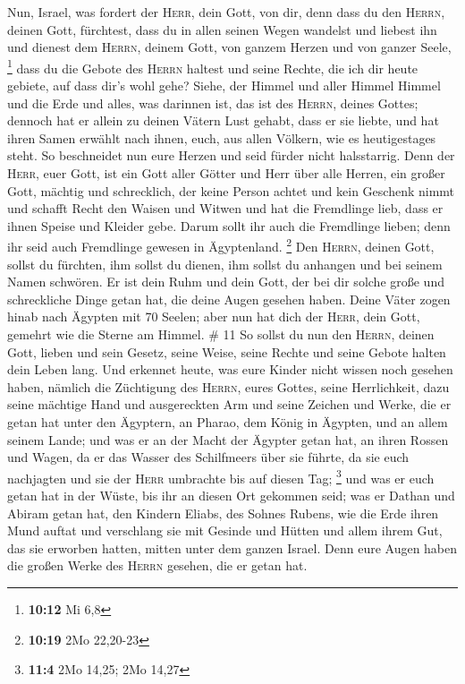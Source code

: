  Nun, Israel, was fordert der \textsc{Herr}, dein Gott,
von dir, denn dass du den \textsc{Herrn}, deinen Gott, fürchtest, dass
du in allen seinen Wegen wandelst und liebest ihn und dienest dem
\textsc{Herrn}, deinem Gott, von ganzem Herzen und von ganzer Seele,
\footnote{\textbf{10:12} Mi 6,8}  dass du die Gebote des
\textsc{Herrn} haltest und seine Rechte, die ich dir heute gebiete, auf
dass dir's wohl gehe?  Siehe, der Himmel und aller Himmel
Himmel und die Erde und alles, was darinnen ist, das ist des
\textsc{Herrn}, deines Gottes;  dennoch hat er allein zu
deinen Vätern Lust gehabt, dass er sie liebte, und hat ihren Samen
erwählt nach ihnen, euch, aus allen Völkern, wie es heutigestages steht.
 So beschneidet nun eure Herzen und seid fürder nicht
halsstarrig.  Denn der \textsc{Herr}, euer Gott, ist ein
Gott aller Götter und Herr über alle Herren, ein großer Gott, mächtig
und schrecklich, der keine Person achtet und kein Geschenk nimmt
 und schafft Recht den Waisen und Witwen und hat die
Fremdlinge lieb, dass er ihnen Speise und Kleider gebe. 
Darum sollt ihr auch die Fremdlinge lieben; denn ihr seid auch
Fremdlinge gewesen in Ägyptenland. \footnote{\textbf{10:19} 2Mo 22,20-23}
 Den \textsc{Herrn}, deinen Gott, sollst du fürchten, ihm
sollst du dienen, ihm sollst du anhangen und bei seinem Namen schwören.
 Er ist dein Ruhm und dein Gott, der bei dir solche große
und schreckliche Dinge getan hat, die deine Augen gesehen haben.
 Deine Väter zogen hinab nach Ägypten mit 70 Seelen; aber
nun hat dich der \textsc{Herr}, dein Gott, gemehrt wie die Sterne am
Himmel. \# 11  So sollst du nun den \textsc{Herrn}, deinen
Gott, lieben und sein Gesetz, seine Weise, seine Rechte und seine Gebote
halten dein Leben lang.  Und erkennet heute, was eure
Kinder nicht wissen noch gesehen haben, nämlich die Züchtigung des
\textsc{Herrn}, eures Gottes, seine Herrlichkeit, dazu seine mächtige
Hand und ausgereckten Arm  und seine Zeichen und Werke,
die er getan hat unter den Ägyptern, an Pharao, dem König in Ägypten,
und an allem seinem Lande;  und was er an der Macht der
Ägypter getan hat, an ihren Rossen und Wagen, da er das Wasser des
Schilfmeers über sie führte, da sie euch nachjagten und sie der
\textsc{Herr} umbrachte bis auf diesen Tag; \footnote{\textbf{11:4} 2Mo
  14,25; 2Mo 14,27}  und was er euch getan hat in der
Wüste, bis ihr an diesen Ort gekommen seid;  was er Dathan
und Abiram getan hat, den Kindern Eliabs, des Sohnes Rubens, wie die
Erde ihren Mund auftat und verschlang sie mit Gesinde und Hütten und
allem ihrem Gut, das sie erworben hatten, mitten unter dem ganzen
Israel.  Denn eure Augen haben die großen Werke des
\textsc{Herrn} gesehen, die er getan hat.

